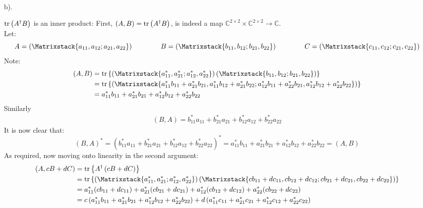 \documentclass[a4paper,12pt]{article}
\newcommand\rbm[1]{\left(\Matrixstack{#1}\right)}
\begin{document}
$\phantom{\text{2.}}$
\begin{minipage}[t]{0.9\textwidth}
  b).
  \begin{minipage}[t]{\textwidth}
    $\trace\left({A^\dagger B}\right)$ is an inner product:
    First, $\left(A, B\right) = \trace\left(A^\dagger B\right)$, is indeed a map $\mathbb{C}^{2\times 2}\times \mathbb{C}^{2\times 2} \to \mathbb{C}$.\\
    Let:
    \begin{equation*}
      A = \rbm{a_{11}, a_{12}; a_{21}, a_{22}} \qquad \qquad B = \rbm{b_{11}, b_{12}; b_{21}, b_{22}} \qquad  \qquad C = \rbm{c_{11}, c_{12}; c_{21}, c_{22}}
    \end{equation*}
    Note:
    \begin{align*}
      \left( A, B \right) &= \trace\left\{\rbm{a_{11}^*, a_{21}^*; a_{12}^*, a_{22}^*} \rbm{b_{11}, b_{12}; b_{21}, b_{22}}\right\}\\
      & = \trace\left\{\rbm{a_{11}^*b_{11} + a_{21}^* b_{21}, a_{11}^*b_{12} + a_{21}^*b_{22}; a_{12}^*b_{11} + a_{22}^*b_{21}, a_{12}^*b_{12} + a_{22}^* b_{22}} \right\} \\
      &= a_{11}^*b_{11} + a_{21}^* b_{21} + a_{12}^*b_{12} + a_{22}^* b_{22}
    \end{align*}
    Similarly
    \begin{align*}
      \left(B, A \right) = b_{11}^*a_{11} + b_{21}^* a_{21} + b_{12}^*a_{12} + b_{22}^* a_{22}
    \end{align*}
    It is now clear that:
    \begin{equation*}
      \left( B, A \right)^* = \left(b_{11}^*a_{11} + b_{21}^* a_{21} + b_{12}^*a_{12} + b_{22}^* a_{22}\right)^* = a_{11}^*b_{11} + a_{21}^* b_{21} + a_{12}^*b_{12} + a_{22}^* b_{22} = \left( A, B\right)
    \end{equation*}
    As required, now moving onto linearity in the second argument:
    \begin{align*}
      \left(A , cB + dC \right) &= \trace\left\{A^\dagger\left(cB + dC\right)\right\}\\
                    &= \trace\left\{\rbm{a_{11}^*, a_{21}^*; a_{12}^*, a_{22}^*} \rbm{cb_{11} + dc_{11}, cb_{12} + d c_{12}; cb_{21}+ d c_{21}, cb_{22}+ d c_{22}}\right\}\\
                    &= a_{11}^*(cb_{11} + dc_{11}) + a_{21}^* (cb_{21} + dc_{21}) + a_{12}^*(cb_{12} + dc_{12}) + a_{22}^* (cb_{22}+ dc_{22})\\
                    &= c\left(a_{11}^*b_{11} + a_{21}^* b_{21} + a_{12}^*b_{12} + a_{22}^*b_{22} \right)+ d\left(a_{11}^*c_{11}  + a_{21}^* c_{21}  + a_{12}^*c_{12} + a_{22}^*c_{22}\right)\\

\end{align*}
\end{minipage}
\end{minipage}
\end{document}
